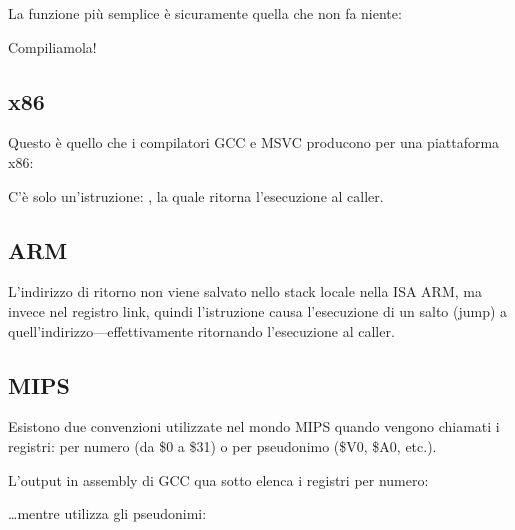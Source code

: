 \label{empty_func}

La funzione più semplice è sicuramente quella che non fa niente:



Compiliamola!

\subsection{x86}

Questo è quello che i compilatori GCC e MSVC producono per una piattaforma x86:



C'è solo un'istruzione: \RET, la quale ritorna l'esecuzione al \gls{caller}.

\subsection{ARM}



L'indirizzo di ritorno non viene salvato nello stack locale nella \ac{ISA} ARM, ma invece nel registro link,
quindi l'istruzione  causa l'esecuzione di un salto (jump) a quell'indirizzo---effettivamente ritornando l'esecuzione
al \gls{caller}.

\subsection{MIPS}

Esistono due convenzioni utilizzate nel mondo MIPS quando vengono chiamati i registri:
per numero (da \$0 a \$31) o per pseudonimo (\$V0, \$A0, etc.).

L'output in assembly di GCC qua sotto elenca i registri per numero:



\dots mentre \IDA utilizza gli pseudonimi:



